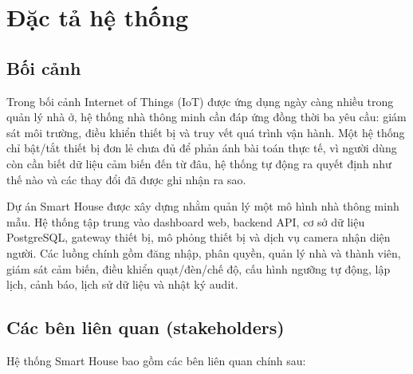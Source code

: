 \section{Đặc tả hệ thống}

\subsection{Bối cảnh}

Trong bối cảnh Internet of Things (IoT) được ứng dụng ngày càng nhiều trong quản lý nhà ở, hệ thống nhà thông minh cần đáp ứng đồng thời ba yêu cầu: giám sát môi trường, điều khiển thiết bị và truy vết quá trình vận hành. Một hệ thống chỉ bật/tắt thiết bị đơn lẻ chưa đủ để phản ánh bài toán thực tế, vì người dùng còn cần biết dữ liệu cảm biến đến từ đâu, hệ thống tự động ra quyết định như thế nào và các thay đổi đã được ghi nhận ra sao.

Dự án Smart House được xây dựng nhằm quản lý một mô hình nhà thông minh mẫu. Hệ thống tập trung vào dashboard web, backend API, cơ sở dữ liệu PostgreSQL, gateway thiết bị, mô phỏng thiết bị và dịch vụ camera nhận diện người. Các luồng chính gồm đăng nhập, phân quyền, quản lý nhà và thành viên, giám sát cảm biến, điều khiển quạt/đèn/chế độ, cấu hình ngưỡng tự động, lập lịch, cảnh báo, lịch sử dữ liệu và nhật ký audit.

\subsection{Các bên liên quan (stakeholders)}

Hệ thống Smart House bao gồm các bên liên quan chính sau:

